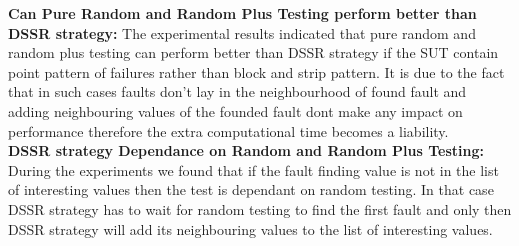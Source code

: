 \documentclass[conference]{IEEEtran}
\begin{document}
\indent \textbf{Can Pure Random and Random Plus Testing perform better than DSSR strategy:}
The experimental results indicated that pure random and random plus testing can perform better than DSSR strategy if the SUT contain point pattern of failures rather than block and strip pattern. It is due to the fact that in such cases faults don't lay in the neighbourhood of found fault and adding neighbouring values of the founded fault dont make any impact on performance therefore the extra computational time becomes a liability.\\
\indent \textbf{DSSR strategy Dependance on Random and Random Plus Testing:}
During the experiments we found that if the fault finding value is not in the list of interesting values then the test is dependant on random testing. In that case DSSR strategy has to wait for random testing to find the first fault and only then DSSR strategy will add its neighbouring values to the list of interesting values.


\end{document}
